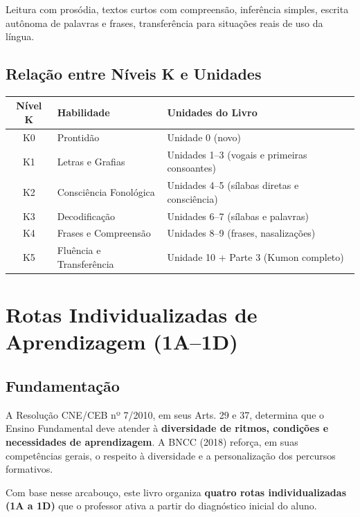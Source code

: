 Leitura com prosódia, textos curtos com compreensão, inferência simples, escrita autônoma de palavras e frases, transferência para situações reais de uso da língua.

\section{Relação entre Níveis K e Unidades}

\begin{center}
\begin{tabular}{|c|l|l|}
\hline
\textbf{Nível K} & \textbf{Habilidade} & \textbf{Unidades do Livro} \\
\hline
K0 & Prontidão & Unidade 0 (novo) \\
\hline
K1 & Letras e Grafias & Unidades 1--3 (vogais e primeiras consoantes) \\
\hline
K2 & Consciência Fonológica & Unidades 4--5 (sílabas diretas e consciência) \\
\hline
K3 & Decodificação & Unidades 6--7 (sílabas e palavras) \\
\hline
K4 & Frases e Compreensão & Unidades 8--9 (frases, nasalizações) \\
\hline
K5 & Fluência e Transferência & Unidade 10 + Parte 3 (Kumon completo) \\
\hline
\end{tabular}
\end{center}


\chapter{Rotas Individualizadas de Aprendizagem (1A--1D)}

\section{Fundamentação}

A Resolução CNE/CEB nº 7/2010, em seus Arts. 29 e 37, determina que o Ensino Fundamental deve atender à \textbf{diversidade de ritmos, condições e necessidades de aprendizagem}. A BNCC (2018) reforça, em suas competências gerais, o respeito à diversidade e a personalização dos percursos formativos.

Com base nesse arcabouço, este livro organiza \textbf{quatro rotas individualizadas (1A a 1D)} que o professor ativa a partir do diagnóstico inicial do aluno.


